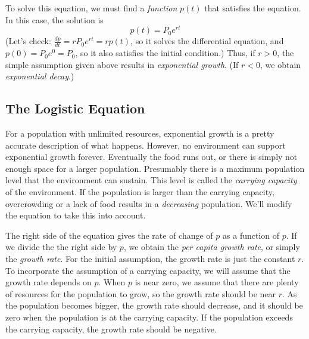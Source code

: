 \documentclass{book}
\begin{document}
To solve this equation, we must find a \emph{function} $p(t)$
that satisfies the equation.  In this case, the solution is
\begin{equation}
  p(t) = P_0 e^{rt}
\end{equation}
(Let's check:  $\frac{dp}{dt} = rP_0e^{rt} = r p(t)$, so  it solves the differential
equation, and $p(0) = P_0e^0 = P_0$, so it also satisfies the initial condition.)
Thus, if $r > 0$, the simple assumption given above results in
\emph{exponential growth}.
(If $r < 0$, we obtain \emph{exponential decay}.)

\subsection{The Logistic Equation}

For a population with unlimited resources, exponential growth
is a pretty accurate description of what happens.
However, no environment can support exponential growth forever.
Eventually the food runs out, or there is simply not enough space
for a larger population.
Presumably there is a maximum population level that the environment
can sustain.  This level is called the
\emph{carrying capacity}
of the environment. If the population is larger than the
carrying capacity, overcrowding or a lack of food results in a
\emph{decreasing} population.
We'll modify the equation to take this into account.

The right side of the equation gives the rate of change of $p$ as a function
of $p$.
If we divide the the right side by $p$, we obtain the
\emph{per capita growth rate},
or simply the \emph{growth rate}.
For the initial assumption,
the growth rate  is just the constant $r$.
To incorporate the assumption of a carrying capacity, we will assume that the
growth rate depends on $p$.  When $p$ is near zero, we assume that there
are plenty of resources for the population to grow, so the growth rate should be
near $r$.  As the population becomes bigger, the growth rate should decrease,
and it should be zero when the population is at the carrying capacity.
If the population exceeds the carrying capacity, the growth rate should
be negative.
\end{document}
